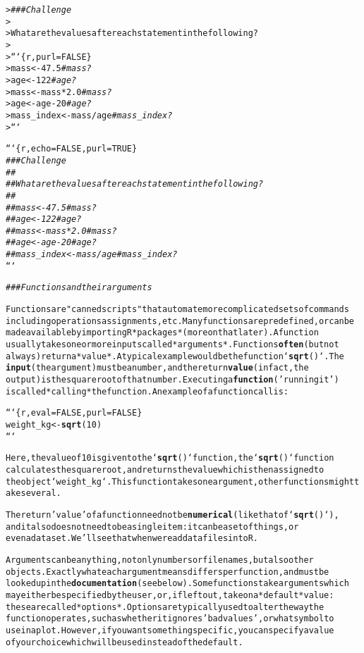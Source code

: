 \documentclass{article}\usepackage[]{graphicx}\usepackage[]{xcolor}
\makeatletter
\newcommand{\hlstr}[1]{\textcolor[rgb]{0.192,0.494,0.8}{#1}}%
\newcommand{\hlcom}[1]{\textcolor[rgb]{0.678,0.584,0.686}{\textit{#1}}}%
\newcommand{\hlkwd}[1]{\textcolor[rgb]{0.737,0.353,0.396}{\textbf{#1}}}%
\newenvironment{kframe}{%
 \def\at@end@of@kframe{}%
 \ifinner\ifhmode%
  \def\at@end@of@kframe{\end{minipage}}%
  \begin{minipage}{\columnwidth}%
 \fi\fi%
 \def\FrameCommand##1{\hskip\@totalleftmargin \hskip-\fboxsep
 \colorbox{shadecolor}{##1}\hskip-\fboxsep
     \hskip-\linewidth \hskip-\@totalleftmargin \hskip\columnwidth}%
 \MakeFramed {\advance\hsize-\width
   \@totalleftmargin\z@ \linewidth\hsize
   \@setminipage}}%
 {\par\unskip\endMakeFramed%
 \at@end@of@kframe}
\newenvironment{knitrout}{}{} %
\makeatother
\begin{document}
\begin{knitrout}
\begin{kframe}
\begin{alltt}
> \hlcom{### Challenge}
>
> What are the values after each statement in the following?
>
> ```\{r, purl = FALSE\}
> mass <- 47.5            \hlcom{# mass?}
> age  <- 122             \hlcom{# age?}
> mass <- mass * 2.0      \hlcom{# mass?}
> age  <- age - 20        \hlcom{# age?}
> mass_index <- mass/age  \hlcom{# mass_index?}
> ```

```\{r, echo = FALSE, purl = TRUE\}
\hlcom{### Challenge}
\hlcom{##}
\hlcom{## What are the values after each statement in the following?}
\hlcom{##}
\hlcom{## mass <- 47.5            # mass?}
\hlcom{## age  <- 122             # age?}
\hlcom{## mass <- mass * 2.0      # mass?}
\hlcom{## age  <- age - 20        # age?}
\hlcom{## mass_index <- mass/age  # mass_index?}
```

\hlcom{### Functions and their arguments}

Functions are \hlstr{"canned scripts"} that automate more complicated sets of commands
including operations assignments, etc. Many functions are predefined, or can be
made available by importing R *packages* (more on that later). A function
usually takes one or more inputs called *arguments*. Functions \hlkwd{often} (but not
always) return a *value*. A typical example would be the function `\hlkwd{sqrt}()`. The
\hlkwd{input} (the argument) must be a number, and the return \hlkwd{value} (in fact, the
output) is the square root of that number. Executing a \hlkwd{function} (\hlstr{'running it'})
is called *calling* the function. An example of a function call is:

```\{r, eval = FALSE, purl = FALSE\}
weight_kg <- \hlkwd{sqrt}(10)
```

Here, the value of 10 is given to the `\hlkwd{sqrt}()` function, the `\hlkwd{sqrt}()` function
calculates the square root, and returns the value which is then assigned to
the object `weight_kg`. This function takes one argument, other functions might take several. 

The return \hlstr{'value'} of a function need not be \hlkwd{numerical} (like that of `\hlkwd{sqrt}()`),
and it also does not need to be a single item: it can be a set of things, or
even a dataset. We'll see that when we read data files into R.

Arguments can be anything, not only numbers or filenames, but also other
objects. Exactly what each argument means differs per function, and must be
looked up in the \hlkwd{documentation} (see below). Some functions take arguments which
may either be specified by the user, or, if left out, take on a *default* value:
these are called *options*. Options are typically used to alter the way the
function operates, such as whether it ignores \hlstr{'bad values'}, or what symbol to
use in a plot.  However, if you want something specific, you can specify a value
of your choice which will be used instead of the default.


\end{alltt}
\end{kframe}
\end{knitrout}
\end{document}
